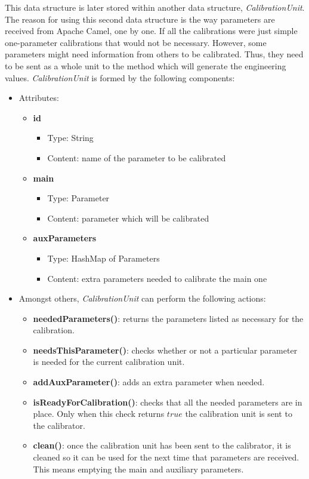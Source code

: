 This data structure is later stored within another data structure, \emph{CalibrationUnit}. The reason for using this second data structure is the way parameters are received from Apache Camel, one by one. If all the calibrations were just simple one-parameter calibrations that would not be necessary. However, some parameters might need information from others to be calibrated. Thus, they need to be sent as a whole unit to the method which will generate the engineering values. \emph{CalibrationUnit} is formed by the following components:

\begin{itemize}
\item Attributes:
	\begin{itemize}
		\item \textbf{id}
			\begin{itemize}
				\item Type: String
				\item Content: name of the parameter to be calibrated
			\end{itemize}
		\item \textbf{main}
			\begin{itemize}
				\item Type: Parameter
				\item Content: parameter which will be calibrated
			\end{itemize}				
		\item \textbf{auxParameters}
			\begin{itemize}
				\item Type: HashMap of Parameters
				\item Content: extra parameters needed to calibrate the main one
			\end{itemize}												
		
	\end{itemize}
	
	\item Amongst others, \emph{CalibrationUnit} can perform the following actions:
	\begin{itemize}
		\item \textbf{neededParameters()}: returns the parameters listed as necessary for the calibration.
		\item \textbf{needsThisParameter()}: checks whether or not a particular parameter is needed for the current calibration unit.
		\item \textbf{addAuxParameter()}: adds an extra parameter when needed.
		\item \textbf{isReadyForCalibration()}: checks that all the needed parameters are in place. Only when this check returns $true$ the calibration unit is sent to the calibrator.
		\item \textbf{clean()}: once the calibration unit has been sent to the calibrator, it is cleaned so it can be used for the next time that parameters are received. This means emptying the main and auxiliary parameters.
	\end{itemize}

\end{itemize}


